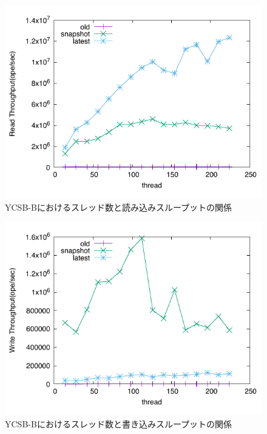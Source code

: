 \documentclass[a4paper]{jreport}	%
\begin{document}
\begin{figure}[h] 
\centering
\includegraphics[width=15cm]{ycsb-b/opposite-read-throughput}
\caption{YCSB-Bにおけるスレッド数と読み込みスループットの関係}
\label{fig:b-throughput-read}
\end{figure}


\begin{figure}[h] 
\centering
\includegraphics[width=15cm]{ycsb-b/opposite-write-throughput}
\caption{YCSB-Bにおけるスレッド数と書き込みスループットの関係}
\label{fig:b-throughput-write}
\end{figure}
\end{document}
